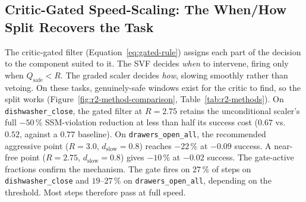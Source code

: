 \documentclass[11pt,a4paper]{report}
\newcommand{\ssm}{SSM}
\begin{document}
\subsection{Critic-Gated Speed-Scaling: The When/How Split Recovers the Task}
\label{sec:results:r2-gated}

The critic-gated filter (Equation~\ref{eq:gated-rule}) assigns each
part of the decision to the component suited to it. The SVF decides
\emph{when} to intervene, firing only when
$Q_{\mathrm{safe}} < R$. The graded scaler decides \emph{how}, slowing
smoothly rather than vetoing. On these tasks, genuinely-safe windows
exist for the critic to find, so the split works
(Figure~\ref{fig:r2-method-comparison}, Table~\ref{tab:r2-methods}).
On \texttt{dishwasher\_close}, the gated filter at $R = 2.75$ retains the unconditional
scaler's full $-50\,\%$ \ssm{}-violation reduction at less than half
its success cost ($0.67$ vs.\ $0.52$, against a $0.77$ baseline). On
\texttt{drawers\_open\_all}, the recommended aggressive point
($R = 3.0$, $d_{\mathrm{slow}} = 0.8$) reaches $-22\,\%$ at $-0.09$
success. A near-free point ($R = 2.75$, $d_{\mathrm{slow}} = 0.8$)
gives $-10\,\%$ at $-0.02$ success. The gate-active fractions confirm
the mechanism. The gate fires on $27\,\%$ of steps on \texttt{dishwasher\_close} and
$19$--$27\,\%$ on \texttt{drawers\_open\_all}, depending on the threshold. Most steps
therefore pass at full speed.
\end{document}
